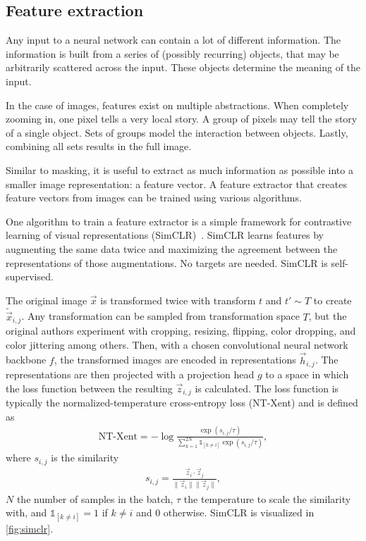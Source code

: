 \subsection{Feature extraction}

Any input to a neural network can contain a lot of different information.
The information is built from a series of (possibly recurring) objects, that may be arbitrarily scattered across the input.
These objects determine the meaning of the input.

In the case of images, features exist on multiple abstractions.
When completely zooming in, one pixel tells a very local story.
A group of pixels may tell the story of a single object.
Sets of groups model the interaction between objects.
Lastly, combining all sets results in the full image.

Similar to masking, it is useful to extract as much information as possible into a smaller image representation: a feature vector.
A feature extractor that creates feature vectors from images can be trained using various algorithms.

One algorithm to train a feature extractor is a simple framework for contrastive learning of visual representations (SimCLR)~\cite{Chen2020}.
SimCLR learns features by augmenting the same data twice and maximizing the agreement between the representations of those augmentations.
No targets are needed.
SimCLR is self-supervised.

The original image $\vec{x}$ is transformed twice with transform $t$ and $t' \sim T$ to create $\tilde{\vec{x}}_{i,j}$.
Any transformation can be sampled from transformation space $T$, but the original authors experiment with cropping, resizing, flipping, color dropping, and color jittering among others.
Then, with a chosen convolutional neural network backbone $f$, the transformed images are encoded in representations $\vec{h}_{i,j}$.
The representations are then projected with a projection head $g$ to a space in which the loss function between the resulting $\vec{z}_{i,j}$ is calculated.
The loss function is typically the normalized-temperature cross-entropy loss (NT-Xent) and is defined as
\begin{align}
    \text{NT-Xent} = - \log \frac{\exp(s_{i,j} / \tau)}{\sum_{k=1}^{2N}\mathbb{1}_{[k\neq i]}\exp(s_{i,j} / \tau)},
\end{align}
where $s_{i,j}$ is the similarity
\begin{align}
    s_{i,j} = \frac{\vec{z}_i \cdot \vec{z}_j }{\|\vec{z}_i\|\|\vec{z}_j\|},
\end{align}
$N$ the number of samples in the batch, $\tau$ the temperature to scale the similarity with, and $\mathbb{1}_{[k\neq i]}=1$ if $k \neq i$ and 0 otherwise.
SimCLR is visualized in \cref{fig:simclr}.


